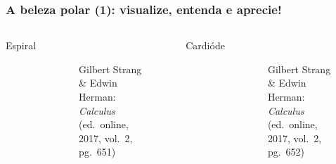 \documentclass[pdftex, brazil, aspectratio=169]{beamer}
\begin{document}
\begin{frame}[t]
  \frametitle{A beleza polar (1): visualize, entenda e aprecie!}
  \begin{columns}
    \centering
    Espiral
    \begin{figure}[H]
      \begin{center}
        \label{fig:int2-18}
        \\
        \footnotesize{Gilbert Strang \& Edwin Herman: \emph{Calculus}
          (ed.\ online, 2017, vol.\ 2, pg.\ 651)}
      \end{center}
    \end{figure}
    \centering
    Cardióde
    \begin{figure}[H]
      \begin{center}
        \label{fig:int2-19}
        \\
        \footnotesize{Gilbert Strang \& Edwin Herman: \emph{Calculus}
          (ed.\ online, 2017, vol.\ 2, pg.\ 652)}
      \end{center}
    \end{figure}
  \end{columns}
\end{frame}
\end{document}
